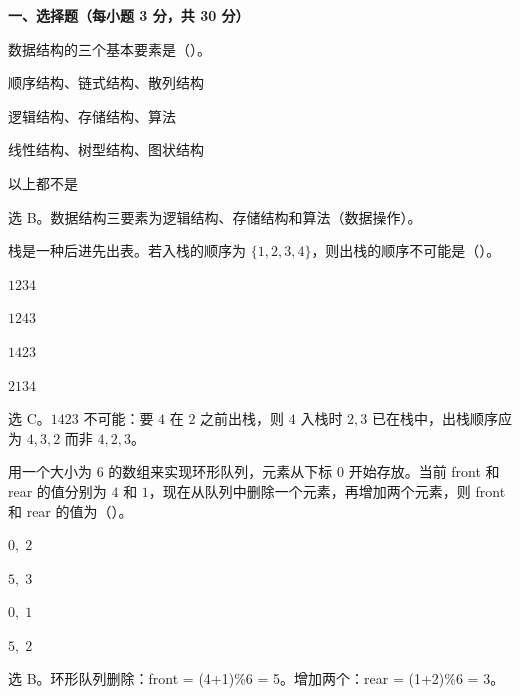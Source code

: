 \textbf{一、选择题（每小题 3 分，共 30 分）}

\begin{question}
数据结构的三个基本要素是（\quad）。
\begin{choiceoptions}[2]
  \item 顺序结构、链式结构、散列结构
  \item 逻辑结构、存储结构、算法
  \item 线性结构、树型结构、图状结构
  \item 以上都不是
\end{choiceoptions}
\begin{solution}
选 B。数据结构三要素为逻辑结构、存储结构和算法（数据操作）。
\end{solution}
\end{question}

\begin{question}
栈是一种后进先出表。若入栈的顺序为 $\{1,2,3,4\}$，则出栈的顺序不可能是（\quad）。
\begin{choiceoptions}[2]
  \item $1234$
  \item $1243$
  \item $1423$
  \item $2134$
\end{choiceoptions}
\begin{solution}
选 C。$1423$ 不可能：要 $4$ 在 $2$ 之前出栈，则 $4$ 入栈时 $2,3$ 已在栈中，出栈顺序应为 $4,3,2$ 而非 $4,2,3$。
\end{solution}
\end{question}

\begin{question}
用一个大小为 $6$ 的数组来实现环形队列，元素从下标 $0$ 开始存放。当前 front 和 rear 的值分别为 $4$ 和 $1$，现在从队列中删除一个元素，再增加两个元素，则 front 和 rear 的值为（\quad）。
\begin{choiceoptions}[1]
  \item $0,\;2$
  \item $5,\;3$
  \item $0,\;1$
  \item $5,\;2$
\end{choiceoptions}
\begin{solution}
选 B。环形队列删除：front = (4+1)\%6 = 5。增加两个：rear = (1+2)\%6 = 3。
\end{solution}
\end{question}

